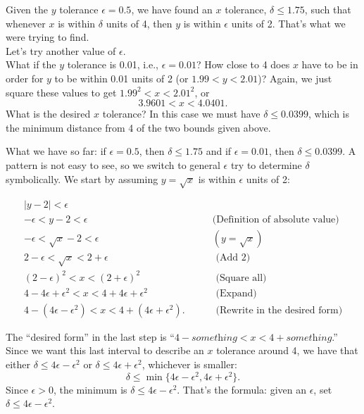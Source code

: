\begin{solution}
{		

Given the $y$ tolerance $\epsilon =0.5$, we have found an $x$ tolerance, $\delta \leq 1.75$, such that whenever $x$ is within $\delta$ units of 4, then $y$ is within $\epsilon$ units of 2.  That's what we were trying to find.\\
  
Let's try another value of $\epsilon$.\\

What if the $y$ tolerance is 0.01, i.e.,  $\epsilon =0.01$?  How close to 4 does $x$ have to be in order for $y$ to be within 0.01 units of 2 (or $1.99 < y < 2.01$)?  Again, we just square these values to get
$1.99^2 < x < 2.01^2$, or 
$$3.9601 < x < 4.0401.$$  
What is the desired $x$ tolerance?  In this case we must have $\delta \leq 0.0399$, which is the minimum distance from 4 of the two bounds given above.  %

What we have so far: if $\epsilon =0.5$, then $\delta \leq 1.75$ and if $\epsilon = 0.01$, then $\delta \leq 0.0399$. A pattern is not easy to see, so we switch to general $\epsilon$ try to determine $\delta$ symbolically.  We start by assuming $y=\sqrt{x}$ is within $\epsilon$ units of 2:

\begin{eqnarray*}
|y - 2| < \epsilon &\\
-\epsilon < y - 2 < \epsilon& \qquad \textrm{(Definition of absolute value)}\\
-\epsilon < \sqrt{x} - 2 < \epsilon  &\qquad (y=\sqrt{x})\\
2 - \epsilon < \sqrt{x} < 2+ \epsilon &\qquad \textrm{ (Add 2)}\\
(2 - \epsilon)^2 < x < (2+ \epsilon) ^2 &\qquad \textrm{ (Square all)}\\
4 - 4\epsilon + \epsilon^2 < x < 4 + 4\epsilon + \epsilon^2 &\qquad \textrm{ (Expand)}\\
4 - (4\epsilon - \epsilon^2) < x < 4 + (4\epsilon + \epsilon^2). &\qquad \textrm{ (Rewrite in the desired form)}
\end{eqnarray*}

The ``desired form'' in the last step is ``$4-\textit{something} < x < 4 +\textit{something}$.''
Since we want this last interval to describe an $x$ tolerance around 4, we have that either $\delta \leq 4\epsilon - \epsilon^2$ or $\delta \leq 4\epsilon + \epsilon^2$, whichever is smaller: $$\delta \leq \min\{4\epsilon - \epsilon^2, 4\epsilon + \epsilon^2\}.$$  Since $\epsilon > 0$, the minimum is $\delta \leq 4\epsilon - \epsilon^2$.  That's the formula: given an $\epsilon$, set $\delta \leq 4\epsilon-\epsilon^2$. 

}
\end{solution}
